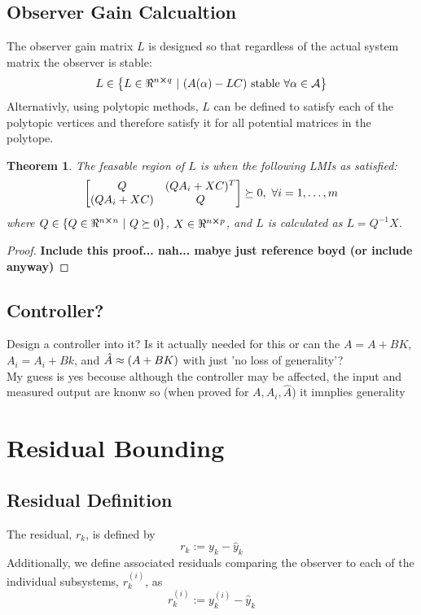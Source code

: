 \documentclass[]{article}
\newtheorem{theorem}{Theorem}
\begin{document}
\subsection{Observer Gain Calcualtion}
The observer gain matrix $L$ is designed so that regardless of the 
actual system matrix the observer is stable:
\begin{equation}\label{eq:L_requirments}
    L \in 
    \qty{L \in \real^{n \cross q} \ | \
        \qty(A(\alpha) - L C) \ \text{stable} \ \forall \alpha \in \mathcal{A}}
\end{equation}
Alternativly, using polytopic methods, $L$ can be defined to satisfy each of the polytopic 
vertices and therefore satisfy it for all potential matrices in the polytope.
\begin{theorem}
    The feasable region of $L$ is when the following LMIs as satisfied:
    \begin{equation}\label{eq:L_feasable_LMIs}
        \mqty[
            Q &(Q A_i + X C)^T\\
            (Q A_i + X C) & Q
            ] \succeq 0, \ \forall i = 1, \dots, m
    \end{equation}
    where $Q \in \{Q \in \real^{n \cross n} \ | \ Q \succeq 0\}$, $X \in \real^{n \cross p}$, 
    and $L$ is calculated as $L = Q^{-1} X$.
\end{theorem}

\begin{proof}
    \textbf{Include this proof... nah... mabye just reference boyd (or include anyway)}
\end{proof}

\subsection{Controller?}
Design a controller into it? Is it actually needed for this or can the 
$A=A+BK$, $A_i = A_i + Bk$, and $\hat{A} \approx \qty(A+BK)$ with just 'no loss of generality'?\\
My guess is yes becouse although the controller may be affected, 
the input and measured output are knonw so (when proved for $A,A_i,\hat{A}$) it imnplies generality

\section{Residual Bounding}
\subsection{Residual Definition}
The residual, $r_k$, is defined by
\begin{equation}\label{eq:r_k_def}
    r_k := y_k - \hat{y}_k
\end{equation}
Additionally, we define associated residuals comparing the observer to each of the 
individual subsystems, $r_k^{(i)}$, as
\begin{equation}\label{eq:r_k_i_def}
    r_k^{(i)} := y_k^{(i)} - \hat{y}_k
\end{equation}
\end{document}
